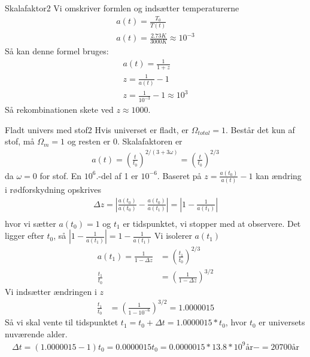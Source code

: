 \begin{opgave}{Skalafaktor}{2}
	\opg Vi omskriver formlen og indsætter temperaturerne
		\begin{align}
		a(t)=\frac{T_0}{T(t)}\\
		a(t)=\frac{2.73 K}{3000 K} \approx 10^{-3}
		\end{align}
		Så kan denne formel bruges:
		\begin{align}
		a(t) = \frac{1}{1+z}\\
		z = \frac{1}{a(t)} - 1\\
		z = \frac{1}{10^{-3}} - 1 \approx 10^3
		\end{align}
		Så rekombinationen skete ved $z\approx 1000$.
\end{opgave}
\begin{opgave}{Fladt univers med stof}{2}
	\opg Hvis universet er fladt, er $\Omega_{total}=1$. Består det kun af stof, må $\Omega_m=1$ og resten er 0.
	\opg Skalafaktoren er
	\begin{align}
	a(t)=\left(\frac{t}{t_0}\right)^{2/(3+3\omega)} = \left(\frac{t}{t_0}\right)^{2/3}
	\end{align}
	da $\omega=0$ for stof.
	\opg En $10^6.$-del af 1 er $10^{-6}$. Baseret på $z=\frac{a(t_0)}{a(t)}-1$ kan ændring i rødforskydning opskrives
	\begin{align}
		\Delta z =|\frac{a(t_0)}{a(t_0)} - \frac{a(t_0)}{a(t_1)}|= |1-\frac{1}{a(t_1)}|\\
	\end{align}
	hvor vi sætter $a(t_0)=1$ og $t_1$ er tidspunktet, vi stopper med at observere. Det ligger efter $t_0$, så $|1-\frac{1}{a(t_1)}|=1 - \frac{1}{a(t_1)}$
	Vi isolerer $a(t_1)$ 
	\begin{align}
	a(t_1) = \frac{1}{1-\Delta z} &= \left(\frac{t_1}{t_0}\right)^{2/3} \\
	\frac{t_1}{t_0} &= \left( \frac{1}{1-\Delta z} \right)^{3/2}
	\end{align}
	Vi indsætter ændringen i $z$
		\begin{align}
		\frac{t_1}{t_0} &= \left( \frac{1}{1-10^{-6}} \right)^{3/2} = 1.0000015
		\end{align}
	Så vi skal vente til tidspunktet $t_1 = t_0 + \Delta t = 1.0000015*t_0$, hvor $t_0$ er universets nuværende alder.
	\begin{align}
		\Delta t = (1.0000015 - 1) t_0 = 0.0000015 t_0 = 0.0000015*13.8*10^{9} \text{år} - = 20700 \text{år}
	\end{align}
\end{opgave}
